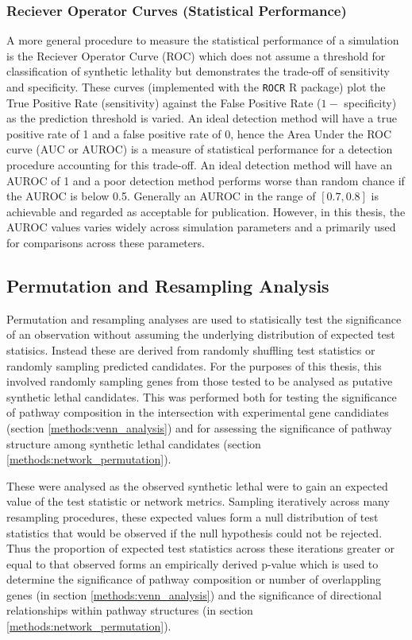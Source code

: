 \subsubsection{Reciever Operator Curves (Statistical Performance)}
A more general procedure to measure the statistical performance of a simulation is the Reciever Operator Curve (ROC) which does not assume a threshold for classification of synthetic lethality but demonstrates the trade-off of sensitivity and specificity. These curves (implemented with the \texttt{ROCR} R package) plot the True Positive Rate (sensitivity) against the False Positive Rate ($1-$ specificity) as the prediction threshold is varied. An ideal detection method will have a true positive rate of 1 and a false positive rate of 0, hence the Area Under the ROC curve (AUC or AUROC) is a measure of statistical performance for a detection procedure accounting for this trade-off. An ideal detection method will have an AUROC of 1 and a poor detection method performs worse than random chance if the AUROC is below 0.5. Generally an AUROC in the range of $[0.7, 0.8]$ is achievable and regarded as acceptable for publication. However, in this thesis, the AUROC values varies widely across simulation parameters and a primarily used for comparisons across these parameters. 

\subsection{Permutation and Resampling Analysis} \label{methods:permutation}
Permutation and resampling analyses are used to statisically test the significance of an observation without assuming the underlying distribution of expected test statisics. Instead these are derived from randomly shuffling test statistics or randomly sampling predicted candidates. For the purposes of this thesis, this involved randomly sampling genes from those tested to be analysed as putative synthetic lethal candidates. This was performed both for testing the significance of pathway composition in the intersection with experimental gene candidiates (section \ref{methods:venn_analysis}) and for assessing the significance of pathway structure among synthetic lethal candidates (section \ref{methods:network_permutation}).

These were analysed as the observed synthetic lethal were to gain an expected value of the test statistic or network metrics. Sampling iteratively across many resampling procedures, these expected values form a null distribution of test statistics that would be observed if the null hypothesis could not be rejected. Thus the proportion of expected test statistics across these iterations greater or equal to that observed forms an empirically derived p-value which is used to determine the significance of pathway composition or number of overlappling genes (in section \ref{methods:venn_analysis}) and the significance of directional relationships within pathway structures (in section \ref{methods:network_permutation}).


